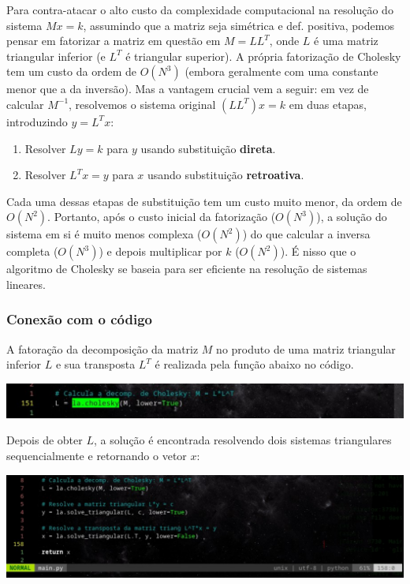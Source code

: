 \documentclass{article}
\begin{document}
    Para contra-atacar o alto custo da complexidade computacional na resolução do sistema $M x = k$, assumindo que a matriz seja simétrica e def. positiva, podemos pensar em fatorizar a matriz em questão em $M = LL^T$, onde $L$ é uma matriz triangular inferior (e $L^T$ é triangular superior). A própria fatorização de Cholesky tem um custo da ordem de $O(N^3)$ (embora geralmente com uma constante menor que a da inversão). Mas a vantagem crucial vem a seguir: em vez de calcular $M^{-1}$, resolvemos o sistema original $(LL^T)x = k$ em duas etapas, introduzindo $y = L^T x$:

    \begin{enumerate}
        \item Resolver $Ly = k$ para $y$ usando substituição \textbf{direta}.
        \item Resolver $L^T x = y$ para $x$ usando substituição \textbf{retroativa}.
    \end{enumerate}

    Cada uma dessas etapas de substituição tem um custo muito menor, da ordem de $O(N^2)$. Portanto, após o custo inicial da fatorização ($O(N^3)$), a solução do sistema em si é muito menos complexa ($O(N^2)$) do que calcular a inversa completa ($O(N^3)$) e depois multiplicar por $k$ ($O(N^2)$). É nisso que o algoritmo de Cholesky se baseia para ser eficiente na resolução de sistemas lineares.

    \subsubsection{Conexão com o código}

    A fatoração da decomposição da matriz $M$ no produto de uma matriz triangular inferior $L$ e sua transposta $L^T$ é realizada pela função abaixo no código.

    \begin{center}
    \includegraphics[width=0.8\linewidth]{imgs/cholesky_1.png}
    \end{center}

    Depois de obter $L$, a solução é encontrada resolvendo dois sistemas triangulares sequencialmente e retornando o vetor $x$:

    \begin{center}
    \includegraphics[width=0.8\linewidth]{imgs/cholesky_2.png}
    \end{center}
\end{document}

